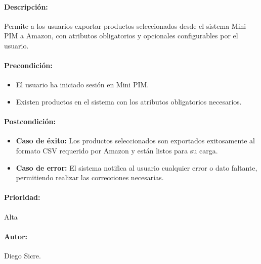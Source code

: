 
{}

\paragraph{Descripción:}
Permite a los usuarios exportar productos seleccionados desde el sistema Mini PIM a Amazon, con atributos obligatorios y opcionales configurables por el usuario.

\paragraph{Precondición:}
\begin{itemize}
    \item El usuario ha iniciado sesión en Mini PIM.
    \item Existen productos en el sistema con los atributos obligatorios necesarios.
\end{itemize}

\paragraph{Postcondición:}
\begin{itemize}
    \item \textbf{Caso de éxito:} Los productos seleccionados son exportados exitosamente al formato CSV requerido por Amazon y están listos para su carga.
    \item \textbf{Caso de error:} El sistema notifica al usuario cualquier error o dato faltante, permitiendo realizar las correcciones necesarias.
\end{itemize}

\paragraph{Prioridad:}
Alta
\paragraph{Autor:}
Diego Sicre.
